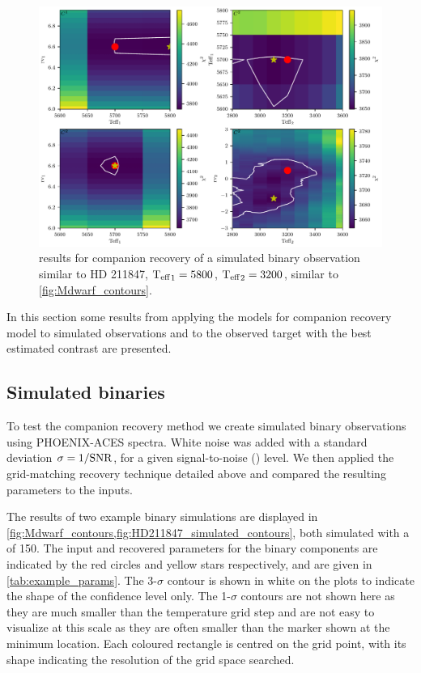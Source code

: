 \begin{figure}
    \centering
    \includegraphics[width=0.7\linewidth]{figures/companion_recovery/HD211847_example_pcolors}
    \caption[\textchisquared{} contour for companion recovery of a simulated observation of {HD 211847}.]{ \textchisquared{} results for companion recovery of a simulated binary observation similar to {HD 211847}, \({\textrm{T}_{\mathrm{eff}}}_{1} = 5800\)\K{}, \({\textrm{T}_{\mathrm{eff}}}_{2} = 3200\)\K{}, similar to \cref{fig:Mdwarf_contours}.}
    \label{fig:HD211847_simulated_contours}
\end{figure}

In this section some results from applying the models for companion recovery model to simulated observations and to the observed target with the best estimated contrast are presented.

\subsection{Simulated binaries}
\label{subsec:simulated_binaries}
To test the companion recovery method we create simulated binary observations using {PHOENIX-ACES} spectra.
White noise was added with a standard deviation \(\rm \sigma = 1/{\textrm{SNR}{}}\), for a given signal-to-noise (\snr{}) level.
We then applied the grid-matching recovery technique detailed above and compared the resulting parameters to the inputs.

The results of two example binary simulations are displayed in \cref{fig:Mdwarf_contours,fig:HD211847_simulated_contours}, both simulated with a \snr{} of 150.
The input and recovered parameters for the binary components are indicated by the red circles and yellow stars respectively, and are given in \cref{tab:example_params}.
The 3-\(\sigma\) contour is shown in white on the plots to indicate the shape of the confidence level only.
The 1-\(\sigma\) contours are not shown here as they are much smaller than the temperature grid step and are not easy to visualize at this scale as they are often smaller than the marker shown at the minimum location.
Each coloured rectangle is centred on the grid point, with its shape indicating the resolution of the grid space searched.

